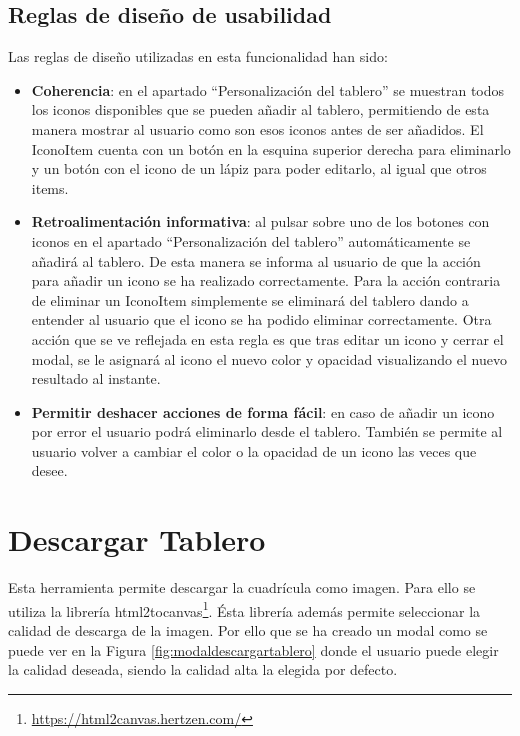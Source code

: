 \subsection{Reglas de diseño de usabilidad}
 Las reglas de diseño utilizadas en esta funcionalidad han sido:
\begin{itemize}
	\item \textbf{Coherencia}: en el apartado “Personalización del tablero” se muestran todos los iconos disponibles que se pueden añadir al tablero, permitiendo de esta manera mostrar al usuario como son esos iconos antes de ser añadidos. El IconoItem cuenta con un botón en la esquina superior derecha para eliminarlo y un botón con el icono de un lápiz para poder editarlo, al igual que otros items.
	
	
	\item \textbf{Retroalimentación informativa}: al pulsar sobre uno de los botones con iconos en el apartado “Personalización del tablero” automáticamente se añadirá al tablero. De esta manera se informa al usuario de que la acción para añadir un icono se ha realizado correctamente. Para la acción contraria de eliminar un IconoItem simplemente se eliminará del tablero dando a entender al usuario que el icono se ha podido eliminar correctamente. Otra acción que se ve reflejada en esta regla es que tras editar un icono y cerrar el modal, se le asignará al icono el nuevo color y opacidad visualizando el nuevo resultado al instante.
	
	
	\item \textbf{Permitir deshacer acciones de forma fácil}: en caso de añadir un icono por error el usuario podrá eliminarlo desde el tablero. También se permite al usuario volver a cambiar el color o la opacidad de un icono las veces que desee.
	
\end{itemize}


\section{Descargar Tablero}
\label{cap5:descargar}

Esta herramienta permite descargar la cuadrícula como imagen. Para ello se utiliza la librería html2tocanvas\footnote{\url{https://html2canvas.hertzen.com/}}. Ésta librería además permite seleccionar la calidad de descarga de la imagen. Por ello que se ha creado un modal como se puede ver en la Figura \ref{fig:modaldescargartablero} donde el usuario puede elegir la calidad deseada, siendo la calidad alta la elegida por defecto. 

